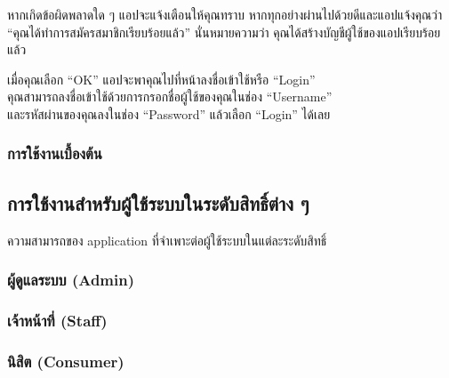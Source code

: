 หากเกิดข้อผิดพลาดใด ๆ แอปจะแจ้งเตือนให้คุณทราบ
หากทุกอย่างผ่านไปด้วยดีและแอปแจ้งคุณว่า ``คุณได้ทำการสมัครสมาชิกเรียบร้อยแล้ว'' นั่นหมายความว่า คุณได้สร้างบัญชีผู้ใช้ของแอปเรียบร้อยแล้ว

เมื่อคุณเลือก ``OK'' แอปจะพาคุณไปที่หน้าลงชื่อเข้าใช้หรือ ``Login''\\
คุณสามารถลงชื่อเข้าใช้ด้วยการกรอกชื่อผู้ใช้ของคุณในช่อง ``Username''\\
และรหัสผ่านของคุณลงในช่อง ``Password'' แล้วเลือก ``Login'' ได้เลย

\clearpage

\subsubsection{การใช้งานเบื้องต้น}\label{subsubsec:gen-use}

\clearpage

\subsection{การใช้งานสำหรับผู้ใช้ระบบในระดับสิทธิ์ต่าง ๆ}
ความสามารถของ application ที่จำเพาะต่อผู้ใช้ระบบในแต่ละระดับสิทธิ์

\subsubsection{ผู้ดูแลระบบ (Admin)}
\noindent\blindtext[3]

\subsubsection{เจ้าหน้าที่ (Staff)}
\noindent\blindtext[3]

\subsubsection{นิสิต (Consumer)}
\noindent\blindtext[3]
